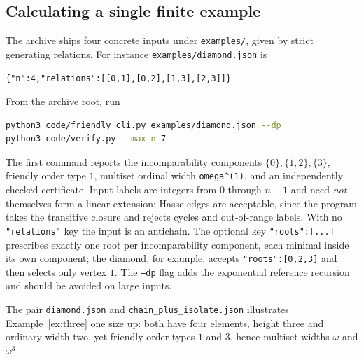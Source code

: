 \documentclass[11pt,letterpaper]{article}
\theoremstyle{definition}
\theoremstyle{remark}
\begin{document}
\subsection{Calculating a single finite example}\label{sec:cli}
The archive ships four concrete inputs under \texttt{examples/}, given by
strict generating relations. For instance
\texttt{examples/diamond.json} is
\begin{lstlisting}
{"n":4,"relations":[[0,1],[0,2],[1,3],[2,3]]}
\end{lstlisting}
From the archive root, run
\begin{lstlisting}[language=bash]
python3 code/friendly_cli.py examples/diamond.json --dp
python3 code/verify.py --max-n 7
\end{lstlisting}
The first command reports the incomparability components
$\{0\},\{1,2\},\{3\}$, friendly order type $1$, multiset ordinal width
\texttt{omega\^{}(1)}, and an independently checked certificate. Input
labels are integers from $0$ through $n-1$ and need \emph{not} themselves
form a linear extension; Hasse edges are acceptable, since the program takes
the transitive closure and rejects cycles and out-of-range labels. With no
\texttt{"relations"} key the input is an antichain. The optional key
\texttt{"roots":[...]} prescribes exactly one root per incomparability
component, each minimal inside its own component; the diamond, for example,
accepts \texttt{"roots":[0,2,3]} and then selects only vertex $1$. The
\texttt{--dp} flag adds the exponential reference recursion and should be
avoided on large inputs.

The pair \texttt{diamond.json} and \texttt{chain\_plus\_isolate.json}
illustrates Example~\ref{ex:three} one size up: both have four elements,
height three and ordinary width two, yet friendly order types $1$ and $3$,
hence multiset widths $\omega$ and $\omega^3$.
\end{document}
